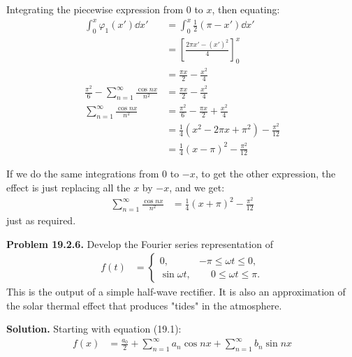\documentclass{article}
\begin{document}
Integrating the piecewise expression from 0 to $x$, then equating:
\begin{equation*}
\begin{aligned}
    \int_0^x \varphi_1(x') \dd x' &= \int_0^x \frac{1}{2}(\pi-x')\dd x' \\
    &= \left[\frac{2\pi x' - (x')^2}{4}\right]_0^x \\
    &= \frac{\pi x}{2} - \frac{x^2}{4} \\
    \frac{\pi^2}{6} - \sum_{n=1}^\infty \frac{\cos nx}{n^2} &= \frac{\pi x}{2} - \frac{x^2}{4} \\
    \sum_{n=1}^\infty \frac{\cos nx}{n^2} &= \frac{\pi^2}{6} - \frac{\pi x}{2} + \frac{x^2}{4} \\
    &= \frac{1}{4}\left(x^2 - 2\pi x + \pi^2\right) - \frac{\pi^2}{12} \\
    &= \frac{1}{4}(x -\pi)^2 -\frac{\pi^2}{12}
\end{aligned}
\end{equation*}

If we do the same integrations from 0 to $-x$, to get the other expression, the effect is just replacing all the $x$ by $-x$, and we get:
\begin{equation*}
\begin{aligned}
    \sum_{n=1}^\infty \frac{\cos nx}{n^2} &= \frac{1}{4}(x +\pi)^2 -\frac{\pi^2}{12}
\end{aligned}
\end{equation*}
just as required.
    
    
\hrulefill

\textbf{Problem 19.2.6.} Develop the Fourier series representation of
\begin{equation*}
\begin{aligned}
    f(t) &= 
    \begin{cases} 
        0, &-\pi\leq\omega t\leq0, \\[1em]
        \sin\omega t, &\phantom{-}0\leq\omega t\leq\pi.
    \end{cases}
\end{aligned}
\end{equation*}
This is the output of a simple half-wave rectifier. It is also an approximation of the solar thermal effect that produces "tides" in the atmosphere.

\textbf{Solution.} Starting with equation (19.1):
\begin{equation*}
\begin{aligned}
    f(x) &= \frac{a_0}{2} + \sum_{n=1}^\infty a_n\cos nx + \sum_{n=1}^\infty b_n \sin nx \\
\end{aligned}
\end{equation*}
\end{document}
